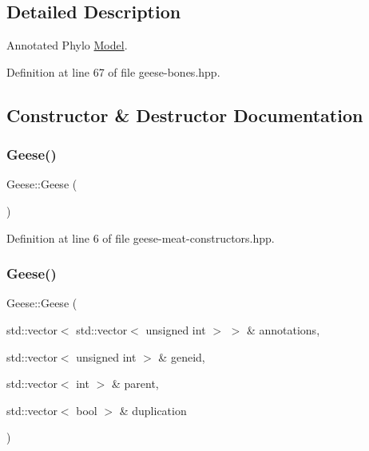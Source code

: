 \subsection{Detailed Description}
Annotated Phylo \hyperlink{class_model}{Model}. 

Definition at line 67 of file geese-\/bones.\+hpp.



\subsection{Constructor \& Destructor Documentation}
\mbox{\label{class_geese_a4766bb548b2a33e16019c52026f455f5}} 
\subsubsection{\texorpdfstring{Geese()}{Geese()}\hspace{0.1cm}{\footnotesize\ttfamily [1/4]}}
{\footnotesize\ttfamily Geese\+::\+Geese (\begin{DoxyParamCaption}{ }\end{DoxyParamCaption})\hspace{0.3cm}{\ttfamily [inline]}}



Definition at line 6 of file geese-\/meat-\/constructors.\+hpp.

\mbox{\label{class_geese_a9ffb63eefb64afb9a5c2b25006e9ab52}} 
\subsubsection{\texorpdfstring{Geese()}{Geese()}\hspace{0.1cm}{\footnotesize\ttfamily [2/4]}}
{\footnotesize\ttfamily Geese\+::\+Geese (\begin{DoxyParamCaption}\item[{std\+::vector$<$ std\+::vector$<$ unsigned int $>$ $>$ \&}]{annotations,  }\item[{std\+::vector$<$ unsigned int $>$ \&}]{geneid,  }\item[{std\+::vector$<$ int $>$ \&}]{parent,  }\item[{std\+::vector$<$ bool $>$ \&}]{duplication }\end{DoxyParamCaption})\hspace{0.3cm}{\ttfamily [inline]}}



